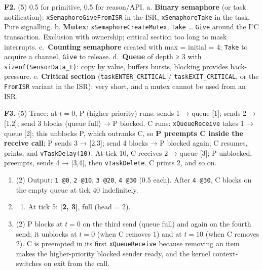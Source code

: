 \documentclass[
  11pt,
]{article}
\providecommand{\tightlist}{%
  \setlength{\itemsep}{0pt}\setlength{\parskip}{0pt}}
\begin{document}
\textbf{F2.} (5) 0.5 for primitive, 0.5 for reason/API. a.
\textbf{Binary semaphore} (or task notification):
\texttt{xSemaphoreGiveFromISR} in the ISR, \texttt{xSemaphoreTake} in
the task. Pure signalling. b. \textbf{Mutex}:
\texttt{xSemaphoreCreateMutex}, \texttt{Take} \ldots{} \texttt{Give}
around the I²C transaction. Exclusion with ownership; critical section
too long to mask interrupts. c.~\textbf{Counting semaphore} created with
max = initial = 4; \texttt{Take} to acquire a channel, \texttt{Give} to
release. d.~\textbf{Queue} of depth ≥ 3 with
\texttt{sizeof(SensorData\_t)}: copy by value, buffers bursts, blocking
provides back-pressure. e. \textbf{Critical section}
(\texttt{taskENTER\_CRITICAL} / \texttt{taskEXIT\_CRITICAL}, or the
\texttt{FromISR} variant in the ISR): very short, and a mutex cannot be
used from an ISR.

\textbf{F3.} (5) Trace: at \(t=0\), P (higher priority) runs: sends 1 →
queue {[}1{]}; sends 2 → {[}1,2{]}; send 3 blocks (queue full) → P
blocked. C runs: \texttt{xQueueReceive} takes 1 → queue {[}2{]}; this
unblocks P, which outranks C, so \textbf{P preempts C inside the receive
call}; P sends 3 → {[}2,3{]}; send 4 blocks → P blocked again; C
resumes, prints, and \texttt{vTaskDelay(10)}. At tick 10, C receives 2 →
queue {[}3{]}; P unblocked, preempts, sends 4 → {[}3,4{]}, then
\texttt{vTaskDelete}. C prints 2, and so on.

\begin{enumerate}
\def\labelenumi{\alph{enumi}.}
\tightlist
\item
  (2) Output: \texttt{1\ @0}, \texttt{2\ @10}, \texttt{3\ @20},
  \texttt{4\ @30} (0.5 each). After \texttt{4\ @30}, C blocks on the
  empty queue at tick 40 indefinitely.
\item
  \begin{enumerate}
  \def\labelenumii{(\arabic{enumii})}
  \tightlist
  \item
    At tick 5: \textbf{{[}2, 3{]}}, full (head = 2).
  \end{enumerate}
\item
  (2) P blocks at \(t=0\) on the third send (queue full) and again on
  the fourth send; it unblocks at \(t = 0\) (when C removes 1) and at
  \(t = 10\) (when C removes 2). C is preempted in its first
  \texttt{xQueueReceive} because removing an item makes the
  higher-priority blocked sender ready, and the kernel context-switches
  on exit from the call.
\end{enumerate}
\end{document}
